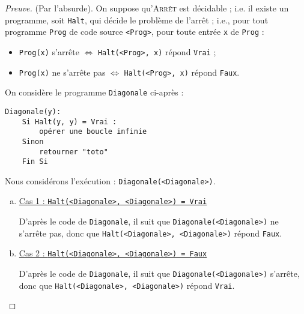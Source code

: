 


\begin{proof}[Preuve]
(Par l'absurde).
On suppose qu'\textsc{Arrêt} est décidable ; i.e.
il existe un programme, 
soit \texttt{Halt}, qui décide le problème de l'arrêt ;
i.e., pour tout programme \texttt{Prog} de code source \texttt{<Prog>}, 
pour toute entrée \texttt{x} de \texttt{Prog} : 
\begin{itemize}
\item
	\texttt{Prog(x)} s'arrête $\iff$
	\texttt{Halt(<Prog>, x)} répond \texttt{Vrai} ;
\item
	\texttt{Prog(x)} ne s'arrête pas $\iff$
	\texttt{Halt(<Prog>, x)} répond \texttt{Faux}.
\end{itemize}

On considère le programme \texttt{Diagonale} ci-après :

\begin{verbatim}
Diagonale(y):
    Si Halt(y, y) = Vrai :
        opérer une boucle infinie
    Sinon
        retourner "toto"
    Fin Si
\end{verbatim}

Nous considérons l'exécution : \texttt{Diagonale(<Diagonale>)}.
\begin{enumerate}[(a)]
\item \underline{Cas 1 : \texttt{Halt(<Diagonale>, <Diagonale>) = Vrai}}

D'après le code de \texttt{Diagonale}, il suit que 
\texttt{Diagonale(<Diagonale>)} ne s'arrête pas, donc que 
\texttt{Halt(<Diagonale>, <Diagonale>)} répond \texttt{Faux}.

\item \underline{Cas 2 : \texttt{Halt(<Diagonale>, <Diagonale>) = Faux}}

D'après le code de \texttt{Diagonale}, il suit que 
\texttt{Diagonale(<Diagonale>)} s'arrête, donc que 
\texttt{Halt(<Diagonale>, <Diagonale>)} répond \texttt{Vrai}.
\end{enumerate}
%
\end{proof}

